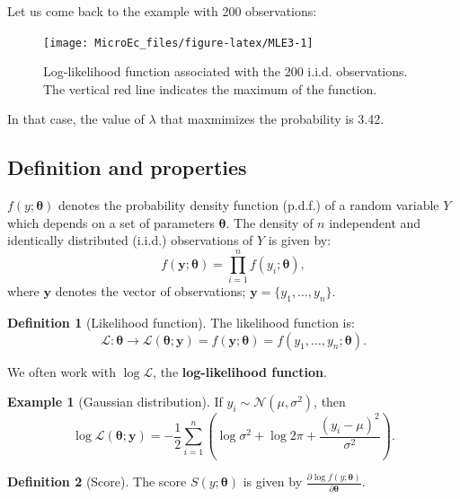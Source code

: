\documentclass[
  12pt,
]{book}
\theoremstyle{definition}
\newtheorem{definition}{Definition}[chapter]
\theoremstyle{definition}
\newtheorem{example}{Example}[chapter]
\theoremstyle{definition}
\theoremstyle{definition}
\theoremstyle{remark}
\begin{document}
Let us come back to the example with 200 observations:

\begin{figure}
\texttt{[image: MicroEc\_files/figure-latex/MLE3-1]} \caption{Log-likelihood function associated with the 200 i.i.d. observations. The vertical red line indicates the maximum of the function.}\label{fig:MLE3}
\end{figure}

In that case, the value of \(\lambda\) that maxmimizes the probability is 3.42.

\hypertarget{definition-and-properties}{%
\subsection{Definition and properties}\label{definition-and-properties}}

\(f(y;\boldsymbol\theta)\) denotes the probability density function (p.d.f.) of a random variable \(Y\) which depends on a set of parameters \(\boldsymbol\theta\). The density of \(n\) independent and identically distributed (i.i.d.) observations of \(Y\) is given by:
\[
f(\mathbf{y};\boldsymbol\theta) = \prod_{i=1}^n f(y_i;\boldsymbol\theta),
\]
where \(\mathbf{y}\) denotes the vector of observations; \(\mathbf{y} = \{y_1,\dots,y_n\}\).

\begin{definition}[Likelihood function]
\protect\hypertarget{def:likelihood}{}\label{def:likelihood}The likelihood function is:
\[
\mathcal{L}: \boldsymbol\theta \rightarrow  \mathcal{L}(\boldsymbol\theta;\mathbf{y})=f(\mathbf{y};\boldsymbol\theta)=f(y_1,\dots,y_n;\boldsymbol\theta).
\]
\end{definition}

We often work with \(\log \mathcal{L}\), the \textbf{log-likelihood function}.

\begin{example}[Gaussian distribution]
\protect\hypertarget{exm:normal}{}\label{exm:normal}If \(y_i \sim \mathcal{N}(\mu,\sigma^2)\), then
\[
\log \mathcal{L}(\boldsymbol\theta;\mathbf{y}) = - \frac{1}{2}\sum_{i=1}^n\left( \log \sigma^2 + \log 2\pi + \frac{(y_i-\mu)^2}{\sigma^2} \right).
\]
\end{example}

\begin{definition}[Score]
\protect\hypertarget{def:score}{}\label{def:score}The score \(S(y;\boldsymbol\theta)\) is given by \(\frac{\partial \log f(y;\boldsymbol\theta)}{\partial \boldsymbol\theta}\).
\end{definition}
\end{document}
